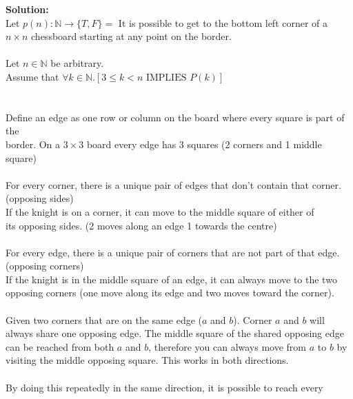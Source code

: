 \documentclass[11pt]{article}
\def\nats {{\mathbb N}}
\newcommand{\Implies}{\mbox{ IMPLIES }}
\begin{document}
\begin{enumerate}
\begin{enumerate}
\begin{solution}
{\bf Solution:}\\
Let $p(n): \nats\rightarrow\{T,F\}=$ It is possible to get to the bottom left corner of a $n\times n$ chessboard starting at any point on the border.\\\\
Let $n\in\nats$ be arbitrary.\\
\null\quad Assume that $\forall k\in\nats.\left[3\le k<n\Implies P(k)\right]$\\\\
\null{}\\
\null\qquad Define an edge as one row or column on the board where every square is part of the\\
\null\qquad border. On a $3\times3$ board every edge has 3 squares (2 corners and 1 middle square)\\\\
\null\qquad For every corner, there is a unique pair of edges that don't contain that corner.\\
\null\qquad (opposing sides)\\
\null\qquad If the knight is on a corner, it can move to the middle square of either of\\
\null\qquad its opposing sides. (2 moves along an edge 1 towards the centre) \\\\
\null\qquad For every edge, there is a unique pair of corners that are not part of that edge.\\
\null\qquad (opposing corners)\\
\null\qquad If the knight is in the middle square of an edge, it can always move to the two \\
\null\qquad opposing corners (one move along its edge and two moves toward the corner).\\\\
\null\qquad Given two corners that are on the same edge ($a$ and $b$). Corner $a$ and $b$ will \\
\null\qquad always share one opposing edge. The middle square of the shared opposing edge  \\
\null\qquad can be reached from both $a$ and $b$, therefore you can always move from $a$ to $b$ by  \\
\null\qquad visiting the middle opposing square. This works in both directions. \\\\
\null\qquad By doing this repeatedly in the same direction, it is possible to reach every  \\

\end{solution}
\end{enumerate}
\end{enumerate}
\end{document}
